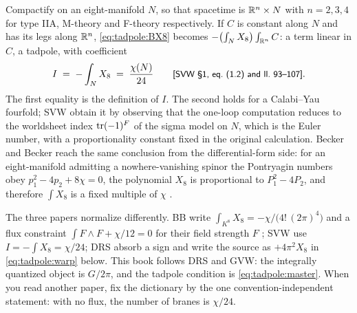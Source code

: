 Compactify on an eight-manifold $N$, so that spacetime is $\mathbb{R}^{n}\times N$ with $n=2,3,4$ for
type IIA, M-theory and F-theory respectively. If $C$ is constant along $N$ and has its legs
along $\mathbb{R}^n$, \eqref{eq:tadpole:BX8} becomes $-\bigl(\int_N X_8\bigr)\int_{\mathbb{R}^n}C$: a term
linear in $C$, a tadpole, with coefficient
\begin{equation}\label{eq:tadpole:I}
 I\;=\;-\int_N X_8 \;=\;\frac{\chi(N)}{24}
 \qquad\text{{\small\textsf{[SVW §1, eq.~(1.2) and ll.~93--107]}}.}
\end{equation}
The first equality is the definition of $I$. The second holds for a Calabi--Yau fourfold; SVW
obtain it by observing that the one-loop computation reduces to the worldsheet index
$\operatorname{tr}(-1)^F$ of the sigma model on $N$, which is the Euler number, with a proportionality
constant fixed in the original calculation. Becker and Becker reach the same conclusion from
the differential-form side: for an eight-manifold admitting a nowhere-vanishing spinor the
Pontryagin numbers obey $p_1^2-4p_2+8\chi=0$, the polynomial $X_8$ is proportional to
$P_1^2-4P_2$, and therefore $\int X_8$ is a fixed multiple of $\chi$
. \TL

\begin{pitfallbox}
The three papers normalize differently. BB write $\int_{K^8}X_8=-\chi/\bigl(4!\,(2\pi)^4\bigr)$
and a flux constraint $\int F\wedge F+\chi/12=0$ for their field strength $F$
; SVW use $I=-\int X_8=\chi/24$; DRS
absorb a sign and write the source as $+4\pi^2X_8$ in \eqref{eq:tadpole:warp} below. This
book follows DRS and GVW: the integrally quantized object is $G/2\pi$, and the tadpole
condition is \eqref{eq:tadpole:master}. When you read another paper, fix the dictionary by
the one convention-independent statement: with no flux, the number of branes is $\chi/24$.
\end{pitfallbox}

